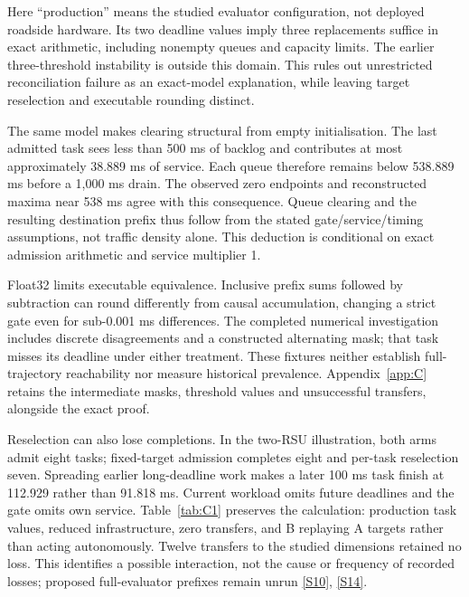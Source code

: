 \documentclass[11pt,a4paper]{article}
\begin{document}
Here ``production'' means the studied evaluator configuration, not deployed roadside hardware. Its two deadline values imply three replacements suffice in exact arithmetic, including nonempty queues and capacity limits. The earlier three-threshold instability is outside this domain. This rules out unrestricted reconciliation failure as an exact-model explanation, while leaving target reselection and executable rounding distinct.

The same model makes clearing structural from empty initialisation. The last admitted task sees less than 500 ms of backlog and contributes at most approximately 38.889 ms of service. Each queue therefore remains below 538.889 ms before a 1,000 ms drain. The observed zero endpoints and reconstructed maxima near 538 ms agree with this consequence. Queue clearing and the resulting destination prefix thus follow from the stated gate/service/timing assumptions, not traffic density alone. This deduction is conditional on exact admission arithmetic and service multiplier 1.

Float32 limits executable equivalence. Inclusive prefix sums followed by subtraction can round differently from causal accumulation, changing a strict gate even for sub-0.001 ms differences. The completed numerical investigation includes discrete disagreements and a constructed alternating mask; that task misses its deadline under either treatment. These fixtures neither establish full-trajectory reachability nor measure historical prevalence. Appendix~\ref{app:C} retains the intermediate masks, threshold values and unsuccessful transfers, alongside the exact proof.

Reselection can also lose completions. In the two-RSU illustration, both arms admit eight tasks; fixed-target admission completes eight and per-task reselection seven. Spreading earlier long-deadline work makes a later 100 ms task finish at 112.929 rather than 91.818 ms. Current workload omits future deadlines and the gate omits own service. Table~\ref{tab:C1} preserves the calculation: production task values, reduced infrastructure, zero transfers, and B replaying A targets rather than acting autonomously. Twelve transfers to the studied dimensions retained no loss. This identifies a possible interaction, not the cause or frequency of recorded losses; proposed full-evaluator prefixes remain unrun \hyperref[source-s10]{[S10]}, \hyperref[source-s14]{[S14]}.
\end{document}
